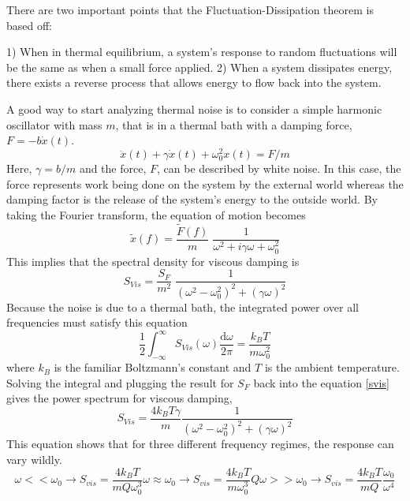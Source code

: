 		There are two important points that the Fluctuation-Dissipation theorem is based off:
		
		1) When in thermal equilibrium, a system's response to random fluctuations will be the same as when a small force applied.
		2) When a system dissipates energy, there exists a reverse process that allows energy to flow back into the system.
		
		A good way to start analyzing thermal noise is to consider a simple harmonic oscillator with mass $m$, that is in a thermal bath with a damping force, $F=-b\dot{x}(t)$.
		\begin{equation}
		\ddot{x}(t) + \gamma \dot{x}(t) + \omega_{0}^2 x(t) = F/m
 		\end{equation}
		Here, $\gamma = b/m$ and the force, $F$, can be described by white noise.  In this case, the force represents work being done on the system by the external world whereas the damping factor is the release of the system's energy to the outside world.  By taking the Fourier transform, the equation of motion becomes
		\begin{equation}\label{harmonic}
		\tilde{x}(f) = \frac{\tilde{F}(f)}{m} \; \frac{1}{\omega^2 +i \gamma \omega + \omega_{0}^2} 
		\end{equation}
		This implies that the spectral density for viscous damping is
		\begin{equation}\label{svis}
		S_{Vis} = \frac{S_F}{m^2} \; \frac{1}{(\omega^2 -\omega_{0}^2)^2 + (\gamma\omega)^2}
		\end{equation}
		Because the noise is due to a thermal bath, the integrated power over all frequencies must satisfy this equation
		\begin{equation}
		\frac{1}{2} \int_{-\infty}^{\infty} S_{Vis} (\omega) \frac{\text{d}\omega}{2\pi} = \frac{k_B T}{m\omega_{0}^2}
		\end{equation}
		where $k_B$ is the familiar Boltzmann's constant and $T$ is the ambient temperature.  Solving the integral and plugging the result for $S_F$ back into the equation \ref{svis} gives the power spectrum for viscous damping,
		\begin{equation}\label{vis}
		S_{Vis} = \frac{4k_B T \gamma}{m} \frac{1}{(\omega^2 - \omega_{0}^2)^2 + (\gamma\omega)^2}
		\end{equation}
		This equation shows that for three different frequency regimes, the response can vary wildly.
		\begin{subequations}
			\begin{equation}
			\omega<< \omega_{0} \rightarrow S_{vis} = \frac{4k_B T}{m Q \omega_{0}^3}
			\end{equation}
			\begin{equation}
			\omega \approx \omega_{0} \rightarrow S_{vis} = \frac{4k_B T}{m \omega_{0}^3} Q
			\end{equation}
			\begin{equation}
			\omega >> \omega_{0} \rightarrow S_{vis} = \frac{4k_B T}{m Q} \frac{\omega_0}{\omega^4} 
			\end{equation}
		\end{subequations}
